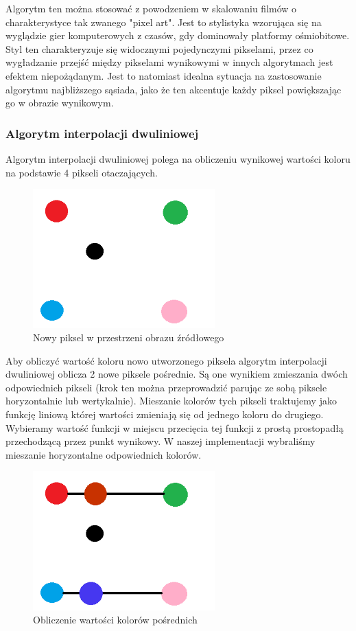 \documentclass[twoside]{projektInzynierskiMS}
\begin{document}
Algorytm ten można stosować z powodzeniem w skalowaniu filmów o charakterystyce tak zwanego "pixel art". Jest to stylistyka wzorująca się na wyglądzie gier komputerowych z czasów, gdy dominowały platformy ośmiobitowe. Styl ten charakteryzuje się widocznymi pojedynczymi pikselami, przez co wygładzanie przejść między pikselami wynikowymi w innych algorytmach jest efektem niepożądanym. Jest to natomiast idealna sytuacja na zastosowanie algorytmu najbliższego sąsiada, jako że ten akcentuje każdy piksel powiększając go w obrazie wynikowym.

\subsubsection{Algorytm interpolacji dwuliniowej}
Algorytm interpolacji dwuliniowej polega na obliczeniu wynikowej wartości koloru na podstawie 4 pikseli otaczających.

\begin{figure}[h]
\centering
\includegraphics[width=7cm]{Interpolation1.png}
\caption{Nowy piksel w przestrzeni obrazu źródłowego}
\end{figure}

Aby obliczyć wartość koloru nowo utworzonego piksela algorytm interpolacji dwuliniowej oblicza 2 nowe piksele pośrednie. Są one wynikiem zmieszania dwóch odpowiednich pikseli (krok ten można przeprowadzić parując ze sobą piksele horyzontalnie lub wertykalnie). Mieszanie kolorów tych pikseli traktujemy jako funkcję liniową której wartości zmieniają się od jednego koloru do drugiego. Wybieramy wartość funkcji w miejscu przecięcia tej funkcji z prostą prostopadłą przechodzącą przez punkt wynikowy. W naszej implementacji wybraliśmy mieszanie horyzontalne odpowiednich kolorów.

\begin{figure}[h]
\centering
\includegraphics[width=7cm]{Interpolation2.png}
\caption{Obliczenie wartości kolorów pośrednich}
\end{figure}
\end{document}
